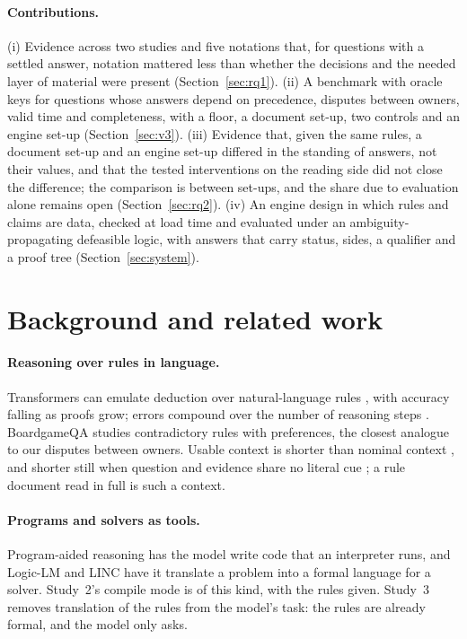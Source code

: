 \documentclass[11pt]{article}
\begin{document}
\paragraph{Contributions.}
(i) Evidence across two studies and five notations that, for questions with a settled answer, notation mattered
less than whether the decisions and the needed layer of material were present (Section~\ref{sec:rq1}).
(ii) A benchmark with oracle keys for questions whose answers depend on precedence, disputes between owners, valid
time and completeness, with a floor, a document set-up, two controls and an engine set-up (Section~\ref{sec:v3}).
(iii) Evidence that, given the same rules, a document set-up and an engine set-up differed in the standing of answers, not their values, and that the tested interventions on the reading side did not close the difference; the comparison is between set-ups, and the share due to evaluation alone remains open (Section~\ref{sec:rq2}).
(iv) An engine design in which rules and claims are data, checked at load time and evaluated under an
ambiguity-propagating defeasible logic, with answers that carry status, sides, a qualifier and a proof tree
(Section~\ref{sec:system}).

\section{Background and related work}
\label{sec:related}

\paragraph{Reasoning over rules in language.} Transformers can emulate deduction over natural-language rules
\citep{clark2020ruletaker,tafjord2021proofwriter}, with accuracy falling as proofs grow; errors compound over the
number of reasoning steps \citep{dziri2023faith}. BoardgameQA \citep{kazemi2023boardgameqa} studies contradictory
rules with preferences, the closest analogue to our disputes between owners. Usable context is shorter than
nominal context \citep{liu2024lost,hsieh2024ruler}, and shorter still when question and evidence share no literal
cue \citep{modarressi2025nolima}; a rule document read in full is such a context.

\paragraph{Programs and solvers as tools.} Program-aided reasoning \citep{gao2023pal,chen2023pot} has the model
write code that an interpreter runs, and Logic-LM \citep{pan2023logiclm} and LINC \citep{olausson2023linc} have it
translate a problem into a formal language for a solver. Study~2's compile mode is of this kind, with the rules
given. Study~3 removes translation of the rules from the model's task: the rules are already formal, and the model
only asks.
\end{document}
